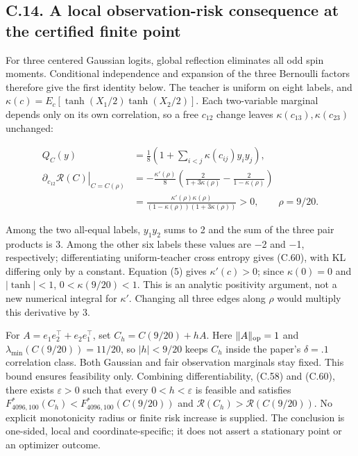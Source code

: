 \documentclass{article}
\begin{document}
\subsection*{C.14. A local observation-risk consequence at the certified
finite
point}\label{c.14.-a-local-observation-risk-consequence-at-the-certified-finite-point}

For three centered Gaussian logits, global reflection eliminates all odd
spin moments. Conditional independence and expansion of the three
Bernoulli factors therefore give the first identity below. The teacher
is uniform on eight labels, and
\(\kappa(c)=E_c[\tanh(X_1/2)\tanh(X_2/2)]\). Each two-variable marginal
depends only on its own correlation, so a free \(c_{12}\) change leaves
\(\kappa(c_{13}),\kappa(c_{23})\) unchanged:

\[
\begin{aligned}
Q_C(y)&=\tfrac18\left(1+\sum_{i<j}\kappa(c_{ij})y_iy_j\right),\\
\left.\partial_{c_{12}}\mathcal R(C)\right|_{C=C(\rho)}
&=-\frac{\kappa'(\rho)}8
\left(\frac2{1+3\kappa(\rho)}-\frac2{1-\kappa(\rho)}\right)\\
&=\frac{\kappa'(\rho)\kappa(\rho)}{(1-\kappa(\rho))(1+3\kappa(\rho))}>0,
\qquad \rho=9/20.
\end{aligned}
\tag{C.60}
\]

Among the two all-equal labels, \(y_1y_2\) sums to 2 and the sum of the
three pair products is 3. Among the other six labels these values are −2
and −1, respectively; differentiating uniform-teacher cross entropy
gives (C.60), with KL differing only by a constant. Equation (5) gives
\(\kappa'(c)>0\); since \(\kappa(0)=0\) and \(|\tanh|<1\),
\(0<\kappa(9/20)<1\). This is an analytic positivity argument, not a new
numerical integral for \(\kappa'\). Changing all three edges along
\(\rho\) would multiply this derivative by 3.

For \(A=e_1e_2^\top+e_2e_1^\top\), set \(C_h=C(9/20)+hA\). Here
\(\|A\|_{\rm op}=1\) and \(\lambda_{\min}(C(9/20))=11/20\), so
\(|h|<9/20\) keeps \(C_h\) inside the paper's \(\delta=.1\) correlation
class. Both Gaussian and fair observation marginals stay fixed. This
bound ensures feasibility only. Combining differentiability, (C.58) and
(C.60), there exists \(\varepsilon>0\) such that every
\(0<h<\varepsilon\) is feasible and satisfies
\(F_{4096,100}^*(C_h)<F_{4096,100}^*(C(9/20))\) and
\(\mathcal R(C_h)>\mathcal R(C(9/20))\). No explicit monotonicity radius
or finite risk increase is supplied. The conclusion is one-sided, local
and coordinate-specific; it does not assert a stationary point or an
optimizer outcome.
\end{document}
